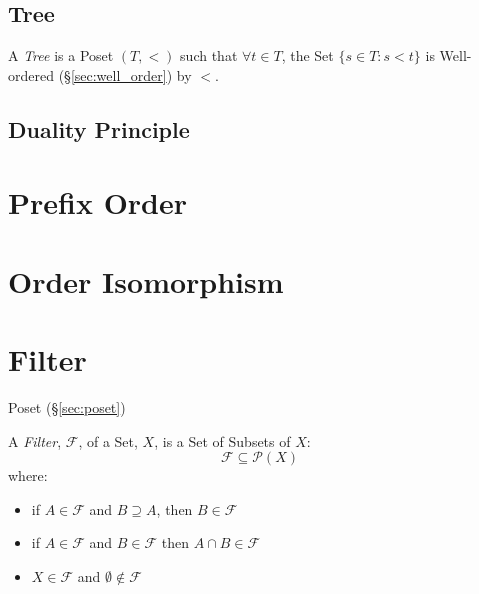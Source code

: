 \subsection{Tree}\label{sec:tree}

A \emph{Tree} is a Poset $(T,<)$ such that $\forall t \in T$, the Set
$\{s \in T : s < t \}$ is Well-ordered (\S\ref{sec:well_order}) by
$<$.



\subsection{Duality Principle}\label{sec:duality_principle}



\section{Prefix Order}\label{sec:prefix_order}

\section{Order Isomorphism}\label{sec:order_isomorphism}

\section{Filter}\label{sec:filter}

Poset (\S\ref{sec:poset})

A \emph{Filter}, $\mathcal{F}$, of a Set, $X$, is a Set of Subsets of
$X$:
\[
  \mathcal{F} \subseteq \mathcal{P}(X)
\]
where:
\begin{itemize}
\item if $A \in \mathcal{F}$ and $B \supseteq A$, then $B \in
  \mathcal{F}$
\item if $A \in \mathcal{F}$ and $B \in \mathcal{F}$ then $A \cap B
  \in \mathcal{F}$
\item $X \in \mathcal{F}$ and $\emptyset \notin \mathcal{F}$
\end{itemize}



